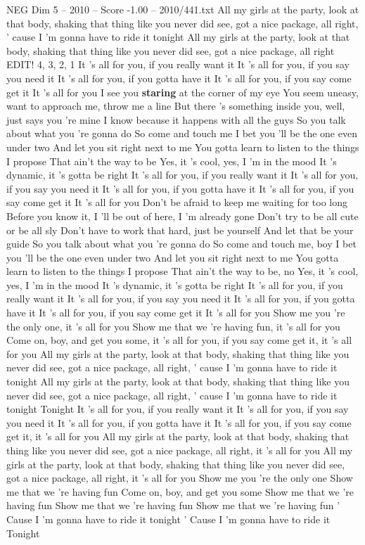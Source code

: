 \begin{textsample}{NEG Dim 5 – 2010 – Score -1.00 – 2010/441.txt}  \label{ex:f5_neg_020}
All my girls at the party, look at that body, shaking that thing like you never did see, got a nice package, all right, ' cause I 'm gonna have to ride it tonight All my girls at the party, look at that body, shaking that thing like you never did see, got a nice package, all right EDIT! 4, 3, 2, 1 It 's all for you, if you really want it It 's all for you, if you say you need it It 's all for you, if you gotta have it It 's all for you, if you say come get it It 's all for you I see you \textbf{staring} at the corner of my eye You seem uneasy, want to approach me, throw me a line But there 's something inside you, well, just says you 're mine I know because it happens with all the guys So you talk about what you 're gonna do So come and touch me I bet you 'll be the one even under two And let you sit right next to me You gotta learn to listen to the things I propose That ain't the way to be Yes, it 's cool, yes, I 'm in the mood It 's dynamic, it 's gotta be right It 's all for you, if you really want it It 's all for you, if you say you need it It 's all for you, if you gotta have it It 's all for you, if you say come get it It 's all for you Don't be afraid to keep me waiting for too long Before you know it, I 'll be out of here, I 'm already gone Don't try to be all cute or be all sly Don't have to work that hard, just be yourself And let that be your guide So you talk about what you 're gonna do So come and touch me, boy I bet you 'll be the one even under two And let you sit right next to me You gotta learn to listen to the things I propose That ain't the way to be, no Yes, it 's cool, yes, I 'm in the mood It 's dynamic, it 's gotta be right It 's all for you, if you really want it It 's all for you, if you say you need it It 's all for you, if you gotta have it It 's all for you, if you say come get it It 's all for you Show me you 're the only one, it 's all for you Show me that we 're having fun, it 's all for you Come on, boy, and get you some, it 's all for you, if you say come get it, it 's all for you All my girls at the party, look at that body, shaking that thing like you never did see, got a nice package, all right, ' cause I 'm gonna have to ride it tonight All my girls at the party, look at that body, shaking that thing like you never did see, got a nice package, all right, ' cause I 'm gonna have to ride it tonight Tonight It 's all for you, if you really want it It 's all for you, if you say you need it It 's all for you, if you gotta have it It 's all for you, if you say come get it, it 's all for you All my girls at the party, look at that body, shaking that thing like you never did see, got a nice package, all right, it 's all for you All my girls at the party, look at that body, shaking that thing like you never did see, got a nice package, all right, it 's all for you Show me you 're the only one Show me that we 're having fun Come on, boy, and get you some Show me that we 're having fun Show me that we 're having fun Show me that we 're having fun ' Cause I 'm gonna have to ride it tonight ' Cause I 'm gonna have to ride it Tonight

\end{textsample}

